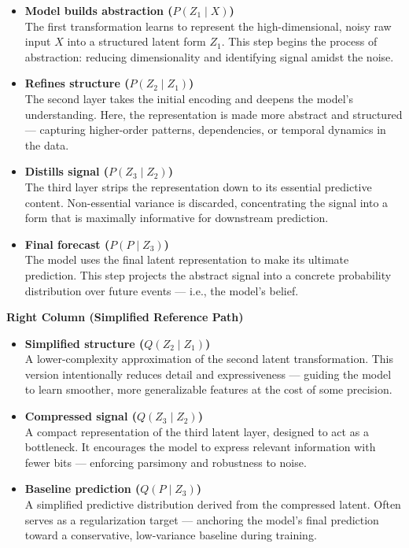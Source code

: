 \begin{itemize}
    \item \textbf{Model builds abstraction ($P(Z_1 \mid X)$)}\\
    The first transformation learns to represent the high-dimensional, noisy raw input \( X \) into a structured latent form \( Z_1 \). This step begins the process of abstraction: reducing dimensionality and identifying signal amidst the noise.

    \item \textbf{Refines structure ($P(Z_2 \mid Z_1)$)}\\
    The second layer takes the initial encoding and deepens the model’s understanding. Here, the representation is made more abstract and structured — capturing higher-order patterns, dependencies, or temporal dynamics in the data.

    \item \textbf{Distills signal ($P(Z_3 \mid Z_2)$)}\\
    The third layer strips the representation down to its essential predictive content. Non-essential variance is discarded, concentrating the signal into a form that is maximally informative for downstream prediction.

    \item \textbf{Final forecast ($P(P \mid Z_3)$)}\\
    The model uses the final latent representation to make its ultimate prediction. This step projects the abstract signal into a concrete probability distribution over future events — i.e., the model’s belief.
\end{itemize}

\vspace{1em}
\textbf{Right Column (Simplified Reference Path)}

\begin{itemize}
    \item \textbf{Simplified structure ($Q(Z_2 \mid Z_1)$)}\\
    A lower-complexity approximation of the second latent transformation. This version intentionally reduces detail and expressiveness — guiding the model to learn smoother, more generalizable features at the cost of some precision.

    \item \textbf{Compressed signal ($Q(Z_3 \mid Z_2)$)}\\
    A compact representation of the third latent layer, designed to act as a bottleneck. It encourages the model to express relevant information with fewer bits — enforcing parsimony and robustness to noise.

    \item \textbf{Baseline prediction ($Q(P \mid Z_3)$)}\\
    A simplified predictive distribution derived from the compressed latent. Often serves as a regularization target — anchoring the model's final prediction toward a conservative, low-variance baseline during training.
\end{itemize}




